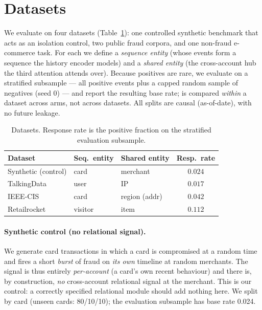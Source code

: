 \section{Datasets}
\label{sec:data}

We evaluate on four datasets (Table~\ref{tab:data}): one controlled synthetic benchmark that acts as
an isolation control, two public fraud corpora, and one non-fraud e-commerce task. For each we define
a \emph{sequence entity} (whose events form a sequence the history encoder models) and a \emph{shared
entity} (the cross-account hub the third attention attends over). Because positives are rare, we
evaluate on a stratified subsample --- all positive events plus a capped random sample of negatives
(seed \num{0}) --- and report the resulting base rate; \prauc{} is compared \emph{within} a dataset
across arms, not across datasets. All splits are causal (as-of-date), with no future leakage.

\begin{table}[t]
\centering
\caption{Datasets. Response rate is the positive fraction on the stratified evaluation subsample.}
\label{tab:data}
\small
\begin{tabular}{lllc}
\toprule
Dataset & Seq.\ entity & Shared entity & Resp.\ rate \\
\midrule
Synthetic (control) & card    & merchant & $0.024$ \\
TalkingData         & user    & IP       & $0.017$ \\
IEEE-CIS            & card    & region (addr) & $0.042$ \\
Retailrocket        & visitor & item     & $0.112$ \\
\bottomrule
\end{tabular}
\end{table}

\paragraph{Synthetic control (no relational signal).} We generate card transactions in which a card
is compromised at a random time and fires a short \emph{burst} of fraud on \emph{its own} timeline at
random merchants. The signal is thus entirely \emph{per-account} (a card's own recent behaviour) and
there is, by construction, \emph{no} cross-account relational signal at the merchant. This is our
control: a correctly specified relational module should add nothing here. We split by card (unseen
cards: \num{80}/\num{10}/\num{10}); the evaluation subsample has base rate \num{0.024}.

